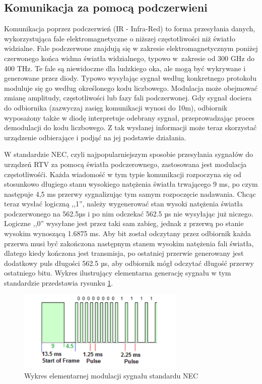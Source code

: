 \documentclass[12pt,twoside]{article}
\begin{document}
\subsection{Komunikacja za pomocą podczerwieni}
Komunikacja poprzez podczerwień\cite{infrared} (IR - Infra-Red) to forma przesyłania danych, wykorzystująca fale elektromagnetyczne
o niższej częstotliwości niż światło widzialne. Fale podczerwone znajdują się w zakresie elektromagnetycznym
poniżej czerwonego końca widma światła widzialnego, typowo w~zakresie od 300 GHz do 400 THz. Te fale są
niewidoczne dla ludzkiego oka, ale mogą być wykrywane i generowane przez diody. Typowo
wysyłając sygnał według konkretnego protokołu moduluje się go według określonego kodu liczbowego.
Modulacja może obejmować zmianę amplitudy, częstotliwości lub fazy fali podczerwonej. Gdy sygnał dociera do odbiornika
(zazwyczaj zasięg komunikacji wynosi do 10m), odbiornik wyposażony także w diodę interpretuje odebrany sygnał, przeprowadzając proces demodulacji do kodu
liczbowego. Z tak wysłanej informacji może teraz skorzystać urządzenie odbierające i podjąć na jej podstawie działania.

W standardzie NEC\cite{necIR}, czyli najpopularniejszym sposobie przesyłania sygnałów do urządzeń RTV za pomocą światła podczerownego, zastosowana jest modulacja częstotliwośći. Każda wiadomość w tym typie komunikacji rozpoczyna się od stosunkowo długiego stanu wysokiego natężenia światła trwającego 9 ms, po czym następuje 4,5 ms przerwy sygnalizując tym samym rozpoczęcie nadawania. Chcąc teraz wysłać logiczną ,,1'', należy wygenerować stan wysoki natężenia światła podczerwonego na 562.5µs i po nim odczekać 562.5 µs nie wysyłając już niczego. Logiczne ,,0'' wysyłane jest przez taki sam zabieg, jednak z przerwą po stanie wysokim wynoszącą 1.6875 ms. Aby bit został odczytany przez odbiornik każda przerwa musi być zakończona następnym stanem wysokim natężenia fali światła, dlatego kiedy kończona jest transmisja, po ostatniej przerwie generowany jest dodatkowy puls długości 562.5 µs, aby odbiornik mógł odczytać długość przerwy ostatniego bitu. Wykres ilustrujący elementarna generację sygnału w tym standardzie przedstawia rysunku \ref*{Fig:necOnesZerosFigure}.
\begin{figure}[ht]
   \centering
   \includegraphics[width=8cm]{images/necOnesAndZeros.png}
   \caption{Wykres elementarnej modulacji sygnału standardu NEC}
   \label{Fig:necOnesZerosFigure}
\end{figure}
\end{document}

